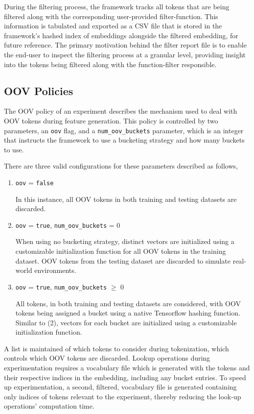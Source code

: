 \documentclass[../../fyp.tex]{subfiles}
\begin{document}
During the filtering process, the framework tracks all tokens that are being filtered along with the corresponding user-provided filter-function. This information is tabulated and exported as a CSV file that is stored in the framework's hashed index of embeddings alongside the filtered embedding, for future reference. The primary motivation behind the filter report file is to enable the end-user to inspect the filtering process at a granular level, providing insight into the tokens being filtered along with the function-filter responsible.

\subsection{OOV Policies}
The OOV policy of an experiment describes the mechanism used to deal with OOV tokens during feature generation. This policy is controlled by two parameters, an \texttt{oov} flag, and a \texttt{num\_oov\_buckets} parameter, which is an integer that instructs the framework to use a bucketing strategy and how many buckets to use.

There are three valid configurations for these parameters described as follows, 

\begin{enumerate}
\item \texttt{oov} = \texttt{false} 

In this instance, all OOV tokens in both training and testing datasets are discarded.

\item \texttt{oov} = \texttt{true}, \texttt{num\_oov\_buckets} = 0

When using no bucketing strategy, distinct vectors are initialized using a customizable initialization function for all OOV tokens in the training dataset. OOV tokens from the testing dataset are discarded to simulate real-world environments.

\item \texttt{oov} = \texttt{true}, \texttt{num\_oov\_buckets} $\geqslant$ 0

All tokens, in both training and testing datasets are considered, with OOV tokens being assigned a bucket using a native Tensorflow hashing function. Similar to (2), vectors for each bucket are initialized using a customizable initialization function.
\end{enumerate}

A list is maintained of which tokens to consider during tokenization, which controls which OOV tokens are discarded. Lookup operations during experimentation requires a vocabulary file which is generated with the tokens and their respective indices in the embedding, including any bucket entries. To speed up experimentation, a second, filtered, vocabulary file is generated containing only indices of tokens relevant to the experiment, thereby reducing the look-up operations' computation time.
\end{document}
